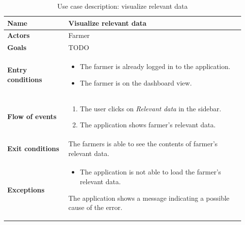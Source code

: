 \begin{table}[H]
    \centering
	\begin{tabular}{@{}p{0.25\linewidth} p{0.72\linewidth}@{}}
\toprule
		\textbf{Name}               & Visualize relevant data \todo{discuss UC changes}\\
		\midrule
		\textbf{Actors}             & Farmer\\
		\midrule
		\textbf{Goals}              & TODO \\
		\midrule
		
		\textbf{Entry conditions}   & \begin{itemize}[leftmargin=.4cm,noitemsep,topsep=0pt,before=\vspace{-3mm},after=\vspace{-4mm}]
		    \item The farmer is already logged in to the application.
		    \item The farmer is on the dashboard view.
		\end{itemize}\\
		\midrule
		
		\textbf{Flow of events}     & \begin{enumerate}[leftmargin=.4cm,noitemsep,topsep=0pt,before=\vspace{-3mm},after=\vspace{-4mm}]
		    \item The user clicks on \textit{Relevant data} in the sidebar.
		    \item The application shows farmer's relevant data.
		\end{enumerate}\\
		\midrule
		\textbf{Exit conditions}    & The farmers is able to see the contents of farmer's relevant data. \\
		\midrule
		
		\textbf{Exceptions}         & 
	    \begin{itemize}[leftmargin=.4cm,noitemsep,topsep=0pt,before=\vspace{-3mm}]
		   \item The application is not able to load the farmer's relevant data.
		\end{itemize}
		The application shows a message indicating a possible cause of the error.
		\\\bottomrule
	\end{tabular}
	\caption{Use case description: visualize relevant data} 
\end{table}


